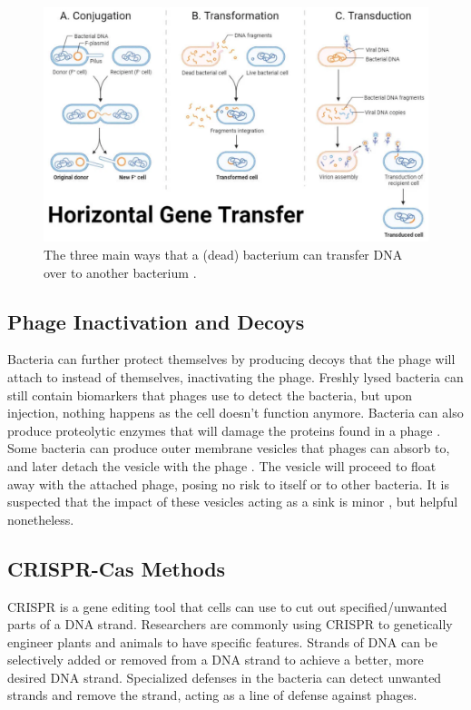 \begin{figure}[h!]
    \centering
    \includegraphics[width=0.7\linewidth]{Figures/horizontal_gene_transfer.png}
    \caption{The three main ways that a (dead) bacterium can transfer DNA over to another bacterium \cite{tamangHorizontalGeneTransfer2023}.}
    \label{fig:horizontal_gene_transfer}
\end{figure}

\subsection{Phage Inactivation and Decoys}
Bacteria can further protect themselves by producing decoys that the phage will attach to instead of themselves, inactivating the phage. 
Freshly lysed bacteria can still contain biomarkers that phages use to detect the bacteria, but upon injection, nothing happens as the cell doesn't function anymore. 
Bacteria can also produce proteolytic enzymes that will damage the proteins found in a phage \cite{tanQuorumSensingDetermines2015}. \newline
Some bacteria can produce outer membrane vesicles that phages can absorb to, and later detach the vesicle with the phage \cite{rabinovitchBacterialDebrisEcological2003}. 
The vesicle will proceed to float away with the attached phage, posing no risk to itself or to other bacteria. 
It is suspected that the impact of these vesicles acting as a sink is minor \cite{bullPhageBacterialDynamicsSpatial2018}, but helpful nonetheless. 


\subsection{CRISPR-Cas Methods}
CRISPR is a gene editing tool that cells can use to cut out specified/unwanted parts of a DNA strand. 
Researchers are commonly using CRISPR to genetically engineer plants and animals to have specific features. 
Strands of DNA can be selectively added or removed from a DNA strand to achieve a better, more desired DNA strand. 
Specialized defenses in the bacteria can detect unwanted strands and remove the strand, acting as a line of defense against phages. 

